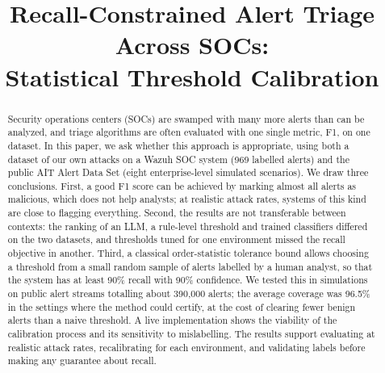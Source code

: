 \documentclass[conference]{IEEEtran}
\begin{document}
\title{Recall-Constrained Alert Triage Across SOCs:\\
Statistical Threshold Calibration}

\author{
\and
{}
}

\maketitle

\begin{abstract}
Security operations centers (SOCs) are swamped with many more alerts than can be analyzed, and triage algorithms are
often evaluated with one single metric, F1, on one dataset. In this paper, we ask whether this approach is appropriate,
using both a dataset of our own attacks on a Wazuh SOC system (969 labelled alerts) and the public AIT Alert Data Set
(eight enterprise-level simulated scenarios). We draw three conclusions. First, a good F1 score can be achieved by
marking almost all alerts as malicious, which does not help analysts; at realistic attack rates, systems of this kind
are close to flagging everything. Second, the results are not transferable between contexts: the ranking of an LLM, a
rule-level threshold and trained classifiers differed on the two datasets, and thresholds tuned for one environment
missed the recall objective in another. Third, a classical order-statistic tolerance bound allows choosing a threshold
from a small random sample of alerts labelled by a human analyst, so that the system has at least 90\% recall with 90\%
confidence. We tested this in simulations on public alert streams totalling about 390,000 alerts; the average coverage
was 96.5\% in the settings where the method could certify, at the cost of clearing fewer benign alerts than a naive
threshold. A live implementation shows the viability of the calibration process and its sensitivity to mislabelling.
The results support evaluating at realistic attack rates, recalibrating for each environment, and validating labels
before making any guarantee about recall.
\end{abstract}
\end{document}
